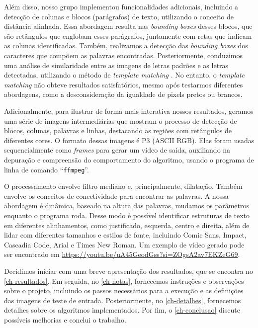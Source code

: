 \documentclass[english, 
               brazil, 
               bsc] %
               {dcomp-abntex2}
\begin{document}
Além disso, nosso grupo implementou funcionalidades adicionais, incluindo a detecção de colunas e blocos (parágrafos) de texto, utilizando o conceito de distância alinhada. Essa abordagem resulta nas \textit{bounding boxes} desses blocos, que são retângulos que englobam esses parágrafos, juntamente com retas que indicam as colunas identificadas. Também, realizamos a detecção das \textit{bounding boxes} dos caracteres que compõem as palavras encontradas. Posteriormente, conduzimos uma análise de similaridade entre as imagens de letras padrões e as letras detectadas, utilizando o método de \textit{template matching} \cite[12.2]{gonzalez2008digital}. No entanto, o \textit{template matching} não obteve resultados satisfatórios, mesmo após testarmos diferentes abordagens, como a desconsideração da igualdade de pixels pretos ou brancos.


Adicionalmente, para ilustrar de forma mais interativa nossos resultados, geramos uma série de imagens intermediárias que mostram o processo de detecção de blocos, colunas, palavras e linhas, destacando as regiões com retângulos de diferentes cores. O formato dessas imagens é P3 (ASCII RGB). Elas foram usadas sequencialmente como \textit{frames} para gerar um vídeo de saída, auxiliando na depuração e compreensão do comportamento do algoritmo, usando o programa de linha de comando ``\texttt{ffmpeg}''.


O processamento envolve filtro mediano e, principalmente, dilatação. Também envolve os conceitos de conectividade para encontrar as palavras. A nossa abordagem é dinâmica, baseado na altura das palavras, mudamos os parâmetros enquanto o programa roda. Desse modo é possível identificar estruturas de texto em diferentes alinhamentos, como justificado, esquerda, centro e direita, além de lidar com diferentes tamanhos e estilos de fonte, incluindo Comic Sans, Impact, Cascadia Code, Arial e Times New Roman. Um exemplo de vídeo gerado pode ser encontrado em \url{https://youtu.be/uA45GeodGss?si=ZOgsA2av7EKZeG69}.


Decidimos iniciar com uma breve apresentação dos resultados, que se encontra no \autoref{ch-resultados}. Em seguida, no \autoref{ch-notas}, fornecemos instruções e observações sobre o projeto, incluindo os passos necessários para a execução e as definições das imagens de teste de entrada. Posteriormente, no \autoref{ch-detalhes}, fornecemos detalhes sobre os algoritmos implementados. Por fim, o \autoref{ch-conclusao} discute possíveis melhorias e conclui o trabalho.
\end{document}
